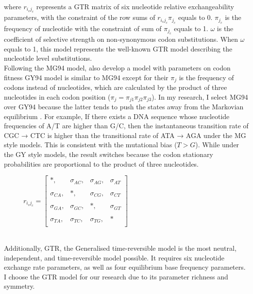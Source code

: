 \noindent where $r_{{i_c} {j_c}}$ represents a GTR matrix of six nucleotide relative exchangeability parameters, with the constraint of the row sums of $r_{{i_c} {j_c}} \pi_{j_c}$ equals to 0. $\pi_{j_c}$ is the frequency of nucleotide with the constraint of sum of $\pi_{j_c}$ equals to 1. $\omega$ is the coefficient of selective strength on non-synonymous codon substitutions. When $\omega$ equals to 1, this model represents the well-known GTR model describing the nucleotide level substitutions.\\
\indent Following the MG94 model, \cite{goldman1994codon} also develop a model with parameters on codon fitness GY94 model is similar to MG94 except for their $\pi_j$ is the frequency of codons instead of nucleotides, which are calculated by the product of three nucleotides in each codon position ($\pi_j = \pi_{j1}\pi_{j2}\pi_{j3}$). In my research, I select MG94 over GY94 because the latter tends to push the states away from the Markovian equilibrium \parencite{rodrigue2008bayesian}. For example, If there exists a DNA sequence whose nucleotide frequencies of A/T are higher than G/C, then the instantaneous transition rate of CGC → CTC is higher than the transitional rate of ATA → AGA under the MG style models. This is consistent with the mutational bias ($T>G$). While under the GY style models, the result switches because the codon stationary probabilities are proportional to the product of three nucleotides.
\begin{figure}[ht]
\centering
$r_{{i_c} {j_c}} = \begin{bmatrix}
            *,&      \sigma_{AC},&  \sigma_{AG},&  \sigma_{AT} \\\\
            \sigma_{CA},&  *,&       \sigma_{CG},&  \sigma_{CT} \\\\
            \sigma_{GA},&  \sigma_{GC},& *,&       \sigma_{GT} \\\\
            \sigma_{TA},&  \sigma_{TC},&  \sigma_{TG},&  * \\
          \end{bmatrix}$
\end{figure}
\\
\indent Additionally, GTR, the Generalised time-reversible model \parencite{tavare1986some} is the most neutral, independent, and time-reversible model possible. It requires six nucleotide exchange rate parameters, as well as four equilibrium base frequency parameters. I choose the GTR model for our research due to its parameter richness and symmetry. \\

